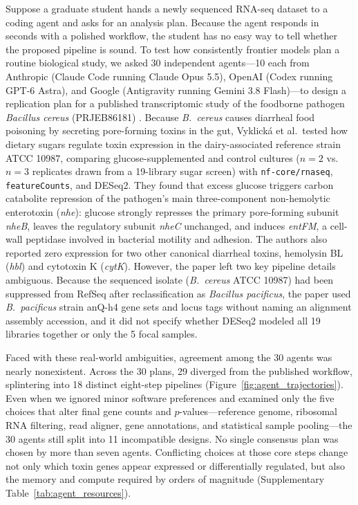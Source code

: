 \documentclass[11pt,letterpaper]{article}
\begin{document}
Suppose a graduate student hands a newly sequenced RNA-seq dataset to a coding agent and asks for an analysis plan. Because the agent responds in seconds with a polished workflow, the student has no easy way to tell whether the proposed pipeline is sound. To test how consistently frontier models plan a routine biological study, we asked 30 independent agents---10 each from Anthropic (Claude Code running Claude Opus 5.5), OpenAI (Codex running GPT-6 Astra), and Google (Antigravity running Gemini 3.8 Flash)---to design a replication plan for a published transcriptomic study of the foodborne pathogen \textit{Bacillus cereus} (PRJEB86181) \cite{vyklicka2026}. Because \textit{B.\ cereus} causes diarrheal food poisoning by secreting pore-forming toxins in the gut, Vyklick{\'a} et al.\ tested how dietary sugars regulate toxin expression in the dairy-associated reference strain ATCC 10987, comparing glucose-supplemented and control cultures ($n = 2$ vs.\ $n = 3$ replicates drawn from a 19-library sugar screen) with \texttt{nf-core/rnaseq}, \texttt{featureCounts}, and DESeq2. They found that excess glucose triggers carbon catabolite repression of the pathogen's main three-component non-hemolytic enterotoxin (\textit{nhe}): glucose strongly represses the primary pore-forming subunit \textit{nheB}, leaves the regulatory subunit \textit{nheC} unchanged, and induces \textit{entFM}, a cell-wall peptidase involved in bacterial motility and adhesion. The authors also reported zero expression for two other canonical diarrheal toxins, hemolysin BL (\textit{hbl}) and cytotoxin K (\textit{cytK}). However, the paper left two key pipeline details ambiguous. Because the sequenced isolate (\textit{B.\ cereus} ATCC 10987) had been suppressed from RefSeq after reclassification as \textit{Bacillus pacificus}, the paper used \textit{B.\ pacificus} strain anQ-h4 gene sets and locus tags without naming an alignment assembly accession, and it did not specify whether DESeq2 modeled all 19 libraries together or only the 5 focal samples.

Faced with these real-world ambiguities, agreement among the 30 agents was nearly nonexistent. Across the 30 plans, 29 diverged from the published workflow, splintering into 18 distinct eight-step pipelines (Figure~\ref{fig:agent_trajectories}). Even when we ignored minor software preferences and examined only the five choices that alter final gene counts and $p$-values---reference genome, ribosomal RNA filtering, read aligner, gene annotations, and statistical sample pooling---the 30 agents still split into 11 incompatible designs. No single consensus plan was chosen by more than seven agents. Conflicting choices at those core steps change not only which toxin genes appear expressed or differentially regulated, but also the memory and compute required by orders of magnitude (Supplementary Table~\ref{tab:agent_resources}).
\end{document}
